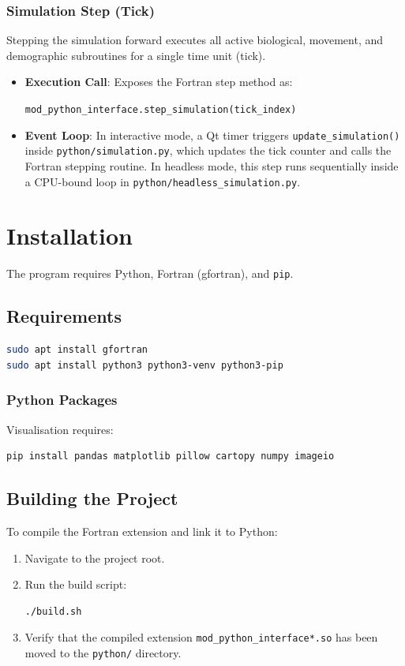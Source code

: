 \subsubsection{Simulation Step (Tick)}
Stepping the simulation forward executes all active biological, movement, and demographic subroutines for a single time unit (tick).
\begin{itemize}
    \item \textbf{Execution Call}: Exposes the Fortran step method as:
    \begin{center}
        \texttt{mod\_python\_interface.step\_simulation(tick\_index)}
    \end{center}
    \item \textbf{Event Loop}: In interactive mode, a Qt timer triggers \texttt{update\_simulation()} inside \texttt{python/simulation.py}, which updates the tick counter and calls the Fortran stepping routine. In headless mode, this step runs sequentially inside a CPU-bound loop in \texttt{python/headless\_simulation.py}.
\end{itemize}

\section{Installation}
The program requires Python, Fortran (gfortran), and \texttt{pip}.

\subsection{Requirements}
\begin{lstlisting}[language=bash]
sudo apt install gfortran
sudo apt install python3 python3-venv python3-pip
\end{lstlisting}

\subsubsection{Python Packages}
Visualisation requires:
\begin{lstlisting}[language=bash]
pip install pandas matplotlib pillow cartopy numpy imageio
\end{lstlisting}

\subsection{Building the Project}
To compile the Fortran extension and link it to Python:
\begin{enumerate}
    \item Navigate to the project root.
    \item Run the build script:
    \begin{lstlisting}[language=bash]
    ./build.sh
    \end{lstlisting}
    \item Verify that the compiled extension \texttt{mod\_python\_interface*.so} has been moved to the \texttt{python/} directory.
\end{enumerate}

